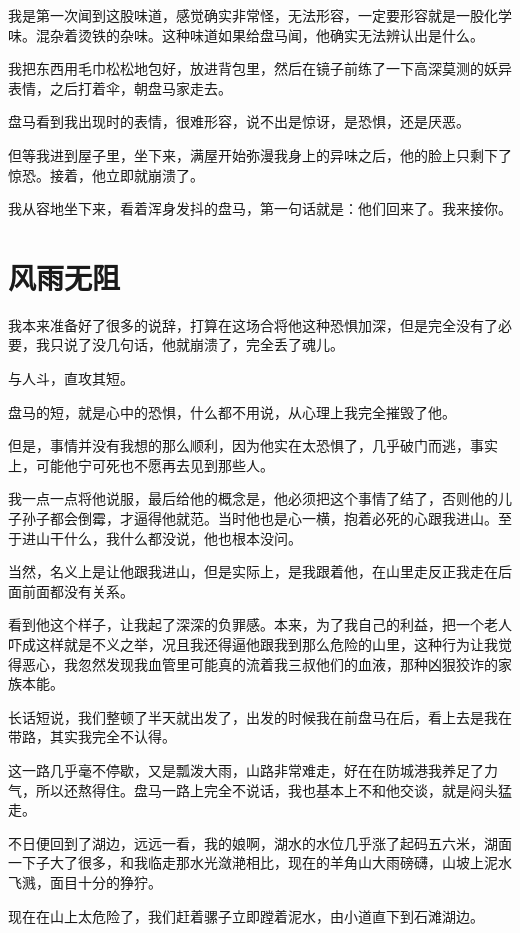 我是第一次闻到这股味道，感觉确实非常怪，无法形容，一定要形容就是一股化学味。混杂着烫铁的杂味。这种味道如果给盘马闻，他确实无法辨认出是什么。

我把东西用毛巾松松地包好，放进背包里，然后在镜子前练了一下高深莫测的妖异表情，之后打着伞，朝盘马家走去。

盘马看到我出现时的表情，很难形容，说不出是惊讶，是恐惧，还是厌恶。

但等我进到屋子里，坐下来，满屋开始弥漫我身上的异味之后，他的脸上只剩下了惊恐。接着，他立即就崩溃了。

我从容地坐下来，看着浑身发抖的盘马，第一句话就是：他们回来了。我来接你。

\chapter{风雨无阻}

我本来准备好了很多的说辞，打算在这场合将他这种恐惧加深，但是完全没有了必要，我只说了没几句话，他就崩溃了，完全丢了魂儿。

与人斗，直攻其短。

盘马的短，就是心中的恐惧，什么都不用说，从心理上我完全摧毁了他。

但是，事情并没有我想的那么顺利，因为他实在太恐惧了，几乎破门而逃，事实上，可能他宁可死也不愿再去见到那些人。

我一点一点将他说服，最后给他的概念是，他必须把这个事情了结了，否则他的儿子孙子都会倒霉，才逼得他就范。当时他也是心一横，抱着必死的心跟我进山。至于进山干什么，我什么都没说，他也根本没问。

当然，名义上是让他跟我进山，但是实际上，是我跟着他，在山里走反正我走在后面前面都没有关系。

看到他这个样子，让我起了深深的负罪感。本来，为了我自己的利益，把一个老人吓成这样就是不义之举，况且我还得逼他跟我到那么危险的山里，这种行为让我觉得恶心，我忽然发现我血管里可能真的流着我三叔他们的血液，那种凶狠狡诈的家族本能。

长话短说，我们整顿了半天就出发了，出发的时候我在前盘马在后，看上去是我在带路，其实我完全不认得。

这一路几乎毫不停歇，又是瓢泼大雨，山路非常难走，好在在防城港我养足了力气，所以还熬得住。盘马一路上完全不说话，我也基本上不和他交谈，就是闷头猛走。

不日便回到了湖边，远远一看，我的娘啊，湖水的水位几乎涨了起码五六米，湖面一下子大了很多，和我临走那水光潋滟相比，现在的羊角山大雨磅礴，山坡上泥水飞溅，面目十分的狰狞。

现在在山上太危险了，我们赶着骡子立即蹚着泥水，由小道直下到石滩湖边。

